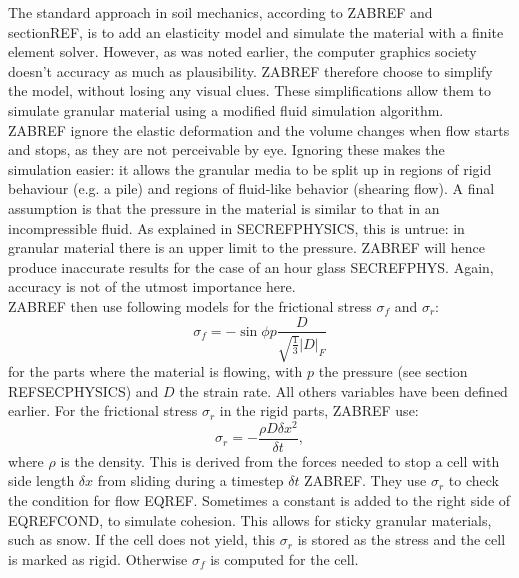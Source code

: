 The standard approach in soil mechanics, according to ZABREF and sectionREF, is to add an elasticity model and simulate the material with a finite element solver. However, as was noted earlier, the computer graphics society doesn't accuracy as much as plausibility. ZABREF therefore choose to simplify the model, without losing any visual clues. These simplifications allow them to simulate granular material using a modified fluid simulation algorithm.\\

ZABREF ignore the elastic deformation and the volume changes when flow starts and stops, as they are not perceivable by eye. Ignoring these makes the simulation easier: it allows the granular media to be split up in regions of rigid behaviour (e.g. a pile) and regions of fluid-like behavior (shearing flow). A final assumption is that the pressure in the material is similar to that in an incompressible fluid. As explained in SECREFPHYSICS, this is untrue: in granular material there is an upper limit to the pressure. ZABREF will hence produce inaccurate results for the case of an hour glass SECREFPHYS. Again, accuracy is not of the utmost importance here.\\

ZABREF then use following models for the frictional stress $\sigma_f$ and $\sigma_r$:
\begin{equation}
\sigma_f = - \sin \phi p \frac{D}{\sqrt{\frac{1}{3}} |D|_F}
\end{equation}
for the parts where the material is flowing, with $p$ the pressure (see section REFSECPHYSICS) and $D$ the strain rate. All others variables have been defined earlier. For the frictional stress $\sigma_r$ in the rigid parts, ZABREF use:
\begin{equation}
\sigma_r = - \frac{\rho D \delta x^2}{\delta t},
\end{equation}
where $\rho$ is the density. This is derived from the forces needed to stop a cell with side length $ \delta x$ from sliding during a timestep $\delta t$ ZABREF. They use $\sigma_r$ to check the condition for flow EQREF. Sometimes a constant is added to the right side of EQREFCOND, to simulate cohesion. This allows for sticky granular materials, such as snow. If the cell does not yield, this $\sigma_r$ is stored as the stress and the cell is marked as rigid. Otherwise $\sigma_f$ is computed for the cell.\\

